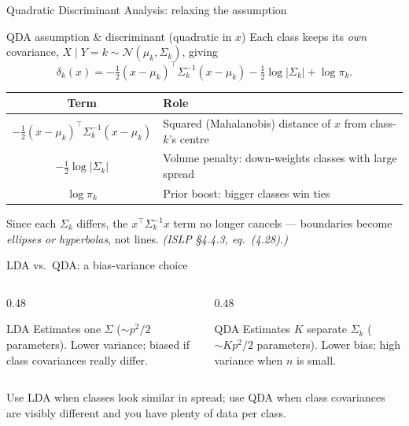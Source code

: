 \documentclass[aspectratio=169,11pt]{beamer}
\begin{document}
\begin{frame}{Quadratic Discriminant Analysis: relaxing the assumption}
  \begin{block}{QDA assumption \& discriminant (quadratic in $x$)}
    Each class keeps its \emph{own} covariance,
    $X \mid Y = k \sim \mathcal{N}(\mu_k, \Sigma_k)$, giving
    \[
      \boxed{\;
      \delta_k(x) = -\tfrac12 (x - \mu_k)^\top \Sigma_k^{-1}(x - \mu_k)
         - \tfrac12 \log|\Sigma_k| + \log \pi_k. \;}
    \]
  \end{block}
  \begin{readme}
    \begin{tabular}{@{}cl@{}}
      \toprule
      \textbf{Term} & \textbf{Role} \\
      \midrule
      $-\tfrac12 (x-\mu_k)^\top \Sigma_k^{-1}(x-\mu_k)$
        & Squared (Mahalanobis) distance of $x$ from class-$k$'s centre \\
      $-\tfrac12 \log|\Sigma_k|$
        & Volume penalty: down-weights classes with large spread \\
      $\log \pi_k$ & Prior boost: bigger classes win ties \\
      \bottomrule
    \end{tabular}
  \end{readme}
  Since each $\Sigma_k$ differs, the $x^\top \Sigma_k^{-1} x$ term no
  longer cancels --- boundaries become \emph{ellipses or hyperbolas},
  not lines. {\tiny\itshape\color{gray}(ISLP \S4.4.3, eq.\ (4.28).)}
\end{frame}

\begin{frame}{LDA vs.\ QDA: a bias-variance choice}
  \begin{columns}[T]
    \begin{column}{0.48\textwidth}
      \begin{block}{LDA}
        Estimates one $\Sigma$ ($\sim p^2/2$ parameters).
        Lower variance; biased if class covariances really differ.
      \end{block}
    \end{column}
    \begin{column}{0.48\textwidth}
      \begin{block}{QDA}
        Estimates $K$ separate $\Sigma_k$ ($\sim K p^2/2$ parameters).
        Lower bias; high variance when $n$ is small.
      \end{block}
    \end{column}
  \end{columns}
  \begin{takeaway}
    Use LDA when classes look similar in spread; use QDA when class
    covariances are visibly different and you have plenty of data per
    class.
  \end{takeaway}
\end{frame}
\end{document}
